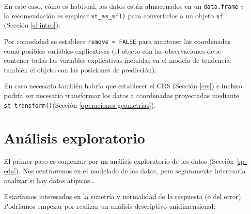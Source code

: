 \documentclass[
]{book}
\newenvironment{Shaded}{\begin{snugshade}}{\end{snugshade}}
\newcommand{\AttributeTok}[1]{\textcolor[rgb]{0.13,0.29,0.53}{#1}}
\newcommand{\CommentTok}[1]{\textcolor[rgb]{0.56,0.35,0.01}{\textit{#1}}}
\newcommand{\ConstantTok}[1]{\textcolor[rgb]{0.56,0.35,0.01}{#1}}
\newcommand{\DecValTok}[1]{\textcolor[rgb]{0.00,0.00,0.81}{#1}}
\newcommand{\FunctionTok}[1]{\textcolor[rgb]{0.13,0.29,0.53}{\textbf{#1}}}
\newcommand{\NormalTok}[1]{#1}
\newcommand{\OtherTok}[1]{\textcolor[rgb]{0.56,0.35,0.01}{#1}}
\newcommand{\SpecialCharTok}[1]{\textcolor[rgb]{0.81,0.36,0.00}{\textbf{#1}}}
\newcommand{\StringTok}[1]{\textcolor[rgb]{0.31,0.60,0.02}{#1}}
\theoremstyle{break}
\theoremstyle{definition}
\theoremstyle{definition}
\theoremstyle{definition}
\theoremstyle{definition}
\theoremstyle{remark}
\begin{document}
En este caso, cómo es habitual, los datos están almacenados en un \texttt{data.frame} y la recomendación es emplear \texttt{st\_as\_sf()} para convertirlos a un objeto \texttt{sf} (Sección \ref{sf-intro}):

\begin{Shaded}
\end{Shaded}

Por comodidad se establece \texttt{remove\ =\ FALSE} para mantener las coordenadas como posibles variables explicativas (el objeto con las observaciones debe contener todas las variables explicativas incluidas en el modelo de tendencia; también el objeto con las posiciones de predicción).

En caso necesario también habría que establecer el CRS (Sección \ref{crs}) e incluso podría ser necesario transformar los datos a coordenadas proyectadas mediante \texttt{st\_transform()}(Sección \ref{operaciones-geometrias}).

\section{Análisis exploratorio}\label{anuxe1lisis-exploratorio}

El primer paso es comenzar por un análisis exploratorio de los datos (Sección \ref{sp-eda}).
Nos centraremos en el modelado de los datos, pero seguramente interesaría analizar si hay datos atípicos\ldots{}

Estaríamos interesados en la simetría y normalidad de la respuesta (o del error).
Podríamos empezar por realizar un análisis descriptivo unidimensional:

\begin{Shaded}
\end{Shaded}
\end{document}
